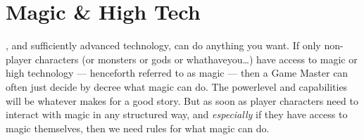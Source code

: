 \chapter{Magic \& High Tech}

, and sufficiently advanced technology, can do anything you want. If only non-player characters (or monsters or gods or whathaveyou\ldots) have access to magic or high technology --- henceforth referred to as magic --- then a Game Master can often just decide by decree what magic can do. The powerlevel and capabilities will be whatever makes for a good story. But as soon as player characters need to interact with magic in any structured way, and \emph{especially} if they have access to magic themselves, then we need rules for what magic can do.

